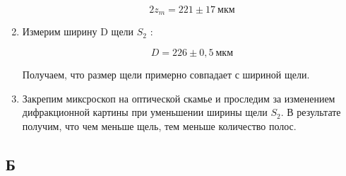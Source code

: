 \documentclass[a4paper, 12pt]{article}%
\begin{document}
\begin{enumerate}
\[2z_m = 221 \pm 17 \: \text{мкм}\]

\item Измерим ширину D щели $S_2$ :

\[D = 226 \pm 0,5 \: \text{мкм}\]

Получаем, что размер щели примерно совпадает с шириной щели.

\item Закрепим миксроскоп на оптической скамье и проследим за изменением дифракционной картины при уменьшении ширины щели $S_2$. В результате получим, что чем меньше щель, тем меньше количество полос.

\end{enumerate}

\subsection*{Б}
\end{document}
